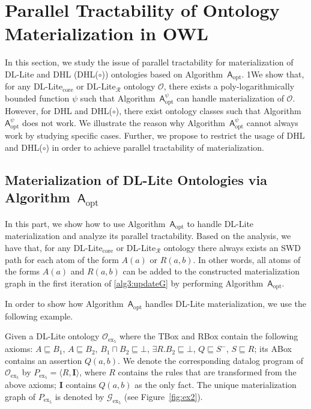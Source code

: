 \section{Parallel Tractability of Ontology Materialization in OWL}
\label{sec:ptonto}

In this section, we study the issue of parallel tractability
for materialization of DL-Lite and DHL (DHL($\circ$)) ontologies
based on Algorithm~$\mathsf{A}_{\text{opt}}$. 1We show that, for any DL-Lite$_{\text{core}}$ or DL-Lite$_\mathcal{R}$ ontology $\mathcal{O}$,
there exists a poly-logarithmically bounded function $\psi$
such that Algorithm~$\mathsf{A}_{\text{opt}}^{\psi}$ can handle materialization of $\mathcal{O}$.
However, for DHL and DHL($\circ$), there exist ontology classes such that Algorithm~$\mathsf{A}_{\text{opt}}^\psi$
does not work. We illustrate the reason why Algorithm~$\mathsf{A}_{\text{opt}}^\psi$ cannot always
work by studying specific cases.
Further, we propose to restrict the usage of DHL and DHL($\circ$) in order to achieve parallel tractability
of materialization.

\subsection{Materialization of DL-Lite Ontologies via Algorithm~$\mathsf{A}_{\text{opt}}$}

In this part, we show how to use Algorithm~$\mathsf{A}_{\text{opt}}$ to handle
DL-Lite materialization and analyze its parallel tractability.
Based on the analysis, we have that, for any DL-Lite$_{\text{core}}$ or DL-Lite$_\mathcal{R}$ ontology
there always exists an SWD path for each atom of the form $A(a)$ or $R(a,b)$.
In other words, all atoms of the forms $A(a)$ and $R(a,b)$ can be added to
the constructed materialization graph in the first iteration of \ref{alg3:updateG}
by performing Algorithm~$\mathsf{A}_{\text{opt}}$.

In order to show how Algorithm~$\mathsf{A}_{\text{opt}}$ handles DL-Lite materialization,
we use the following example.

\begin{example}\label{exp:dllite}
Given a DL-Lite ontology $\mathcal{O}_{\text{ex}_5}$
where the TBox and RBox contain the following axioms:
$A\sqsubseteq B_1$, $A\sqsubseteq B_2$, $B_1\sqcap B_2\sqsubseteq\bot$,
$\exists R.B_2\sqsubseteq\bot$, $Q\sqsubseteq S^-$, $S\sqsubseteq R$;
its ABox contains an assertion $Q(a,b)$.
We denote the corresponding datalog program of $\mathcal{O}_{\text{ex}_5}$ by $P_{\text{ex}_5}=\langle R, \textbf{I}\rangle$,
where $R$ contains the rules that are transformed from the above axioms; $\textbf{I}$ contains $Q(a,b)$
as the only fact.
The unique materialization graph of $P_{\text{ex}_5}$ is denoted by $\mathcal{G}_{\text{ex}_5}$ (see Figure~\ref{fig:ex2}).
\end{example}


